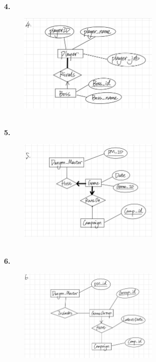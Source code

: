 \documentclass[letterpaper,11pt]{article}
\newcommand{\Paragraph}[1]{~\vspace*{-0.7\baselineskip}\\{\bf #1}}
\begin{document}
\Paragraph{4.}
\begin{figure}[h]
    \centering
    \includegraphics[width=0.6\textwidth]{p1-1-4.jpg}
\end{figure}

\newpage
\Paragraph{5.}
\begin{figure}[h]
    \centering
    \includegraphics[width=0.6\textwidth]{p1-1-5.jpg}
\end{figure}

\Paragraph{6.}
\begin{figure}[h]
    \centering
    \includegraphics[width=0.6\textwidth]{p1-1-6.jpg}
\end{figure}

\newpage
\end{document}
